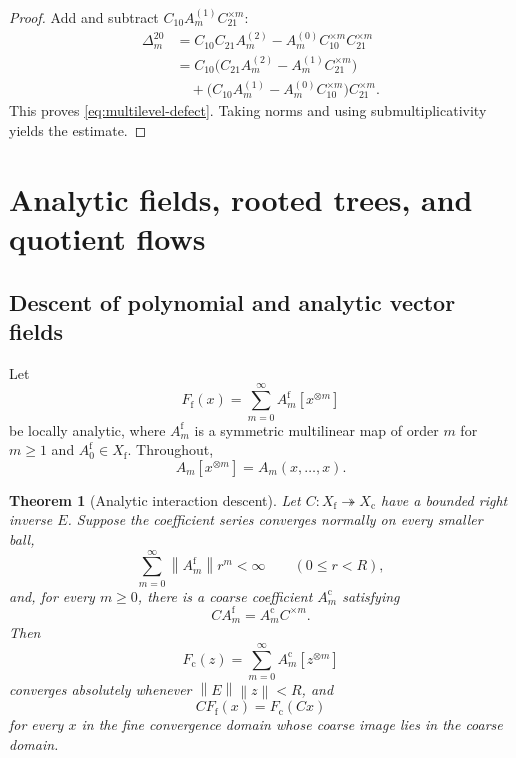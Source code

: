 \documentclass[11pt]{article}
\newtheorem{theorem}{Theorem}[section]
\theoremstyle{definition}
\theoremstyle{remark}
\newcommand{\norm}[1]{\left\lVert #1\right\rVert}
\newcommand{\fine}{\mathrm f}
\newcommand{\coarse}{\mathrm c}
\begin{document}
\begin{proof}
Add and subtract $C_{10}A_m^{(1)}C_{21}^{\times m}$:
\begin{align*}
\Delta_m^{20}
&=C_{10}C_{21}A_m^{(2)}-A_m^{(0)}C_{10}^{\times m}C_{21}^{\times m}\\
&=C_{10}\bigl(C_{21}A_m^{(2)}-A_m^{(1)}C_{21}^{\times m}\bigr)\\
&\quad+
\bigl(C_{10}A_m^{(1)}-A_m^{(0)}C_{10}^{\times m}\bigr)C_{21}^{\times m}.
\end{align*}
This proves \eqref{eq:multilevel-defect}.  Taking norms and using submultiplicativity yields the estimate.
\end{proof}

\section{Analytic fields, rooted trees, and quotient flows}\label{sec:analytic}

\subsection{Descent of polynomial and analytic vector fields}
Let
\begin{equation}\label{eq:fine-analytic-field}
  F_{\fine}(x)
  =
  \sum_{m=0}^{\infty}A_m^{\fine}[x^{\otimes m}]
\end{equation}
be locally analytic, where $A_m^{\fine}$ is a symmetric multilinear map of order $m$ for $m\geq1$ and $A_0^{\fine}\in X_{\fine}$.  Throughout,
\[
  A_m[x^{\otimes m}]
  =A_m(x,\ldots,x).
\]

\begin{theorem}[Analytic interaction descent]\label{thm:analytic-descent}
Let $C:X_{\fine}\twoheadrightarrow X_{\coarse}$ have a bounded right inverse $E$.  Suppose the coefficient series converges normally on every smaller ball,
\begin{equation}\label{eq:fine-normal-summability}
  \sum_{m=0}^{\infty}\norm{A_m^{\fine}}r^m<\infty
  \qquad(0\leq r<R),
\end{equation}
and, for every $m\geq0$, there is a coarse coefficient $A_m^{\coarse}$ satisfying
\begin{equation}\label{eq:coefficientwise-descent}
  CA_m^{\fine}=A_m^{\coarse}C^{\times m}.
\end{equation}
Then
\begin{equation}\label{eq:coarse-analytic-field}
  F_{\coarse}(z)
  =
  \sum_{m=0}^{\infty}A_m^{\coarse}[z^{\otimes m}]
\end{equation}
converges absolutely whenever $\norm{E}\norm{z}<R$, and
\begin{equation}\label{eq:analytic-field-intertwining}
  \boxed{CF_{\fine}(x)=F_{\coarse}(Cx)}
\end{equation}
for every $x$ in the fine convergence domain whose coarse image lies in the coarse domain.
\end{theorem}
\end{document}
